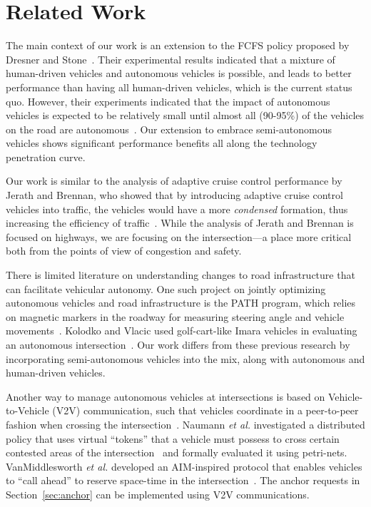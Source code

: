 \section{Related Work}
\label{sec:related}

The main context of our work is an extension to the FCFS policy
proposed by Dresner and Stone~\cite{bib:Dresner08Multiagent}. Their
experimental results indicated that a mixture of human-driven vehicles
and autonomous vehicles is possible, and leads to better performance
than having all human-driven vehicles, which is the current status
quo.  However, their experiments indicated that the impact of
autonomous vehicles is expected to be relatively small until almost
all (90-95\%) of the vehicles on the road are
autonomous~\cite{bib:Dresner07Sharing}.  Our extension to embrace
semi-autonomous vehicles shows significant performance benefits all
along the technology penetration curve.

Our work is similar to the analysis of adaptive cruise control
performance by Jerath and Brennan, who showed that by introducing
adaptive cruise control vehicles into traffic, the vehicles would have
a more \textit{condensed} formation, thus increasing the efficiency of
traffic~\cite{bib:Jerath10adaptive}.  While the analysis of Jerath and
Brennan is focused on highways, we are focusing on the
intersection---a place more critical both from the points of view of
congestion and safety.

There is limited literature on understanding changes to road
infrastructure that can facilitate vehicular autonomy.  One such
project on jointly optimizing autonomous vehicles and road
infrastructure is the PATH program, which relies on magnetic markers
in the roadway for measuring steering angle and vehicle
movements~\cite{mybib:Shladover91Automated}.  Kolodko and Vlacic used
golf-cart-like Imara vehicles in evaluating an autonomous
intersection~\cite{Kolodko03:INRIA}.  Our work differs from these
previous research by incorporating semi-autonomous vehicles into the
mix, along with autonomous and human-driven vehicles.

Another way to manage autonomous vehicles at intersections is based on
Vehicle-to-Vehicle (V2V) communication, such that vehicles coordinate
in a peer-to-peer fashion when crossing the
intersection~\cite{my_naumann97:intersection,ATT08-vanmiddlesworth}.
Naumann {\em et al.} investigated a distributed policy that uses
virtual ``tokens'' that a vehicle must possess to cross certain
contested areas of the intersection~\cite{my_naumann97:intersection} and
formally evaluated it using petri-nets.  VanMiddlesworth {\em et al.}
developed an AIM-inspired protocol that enables vehicles to ``call
ahead'' to reserve space-time in the
intersection~\cite{ATT08-vanmiddlesworth}.  The anchor requests in
Section~\ref{sec:anchor} can be implemented using V2V communications.


